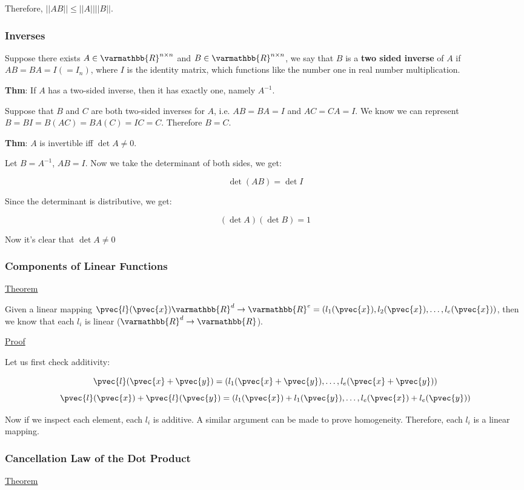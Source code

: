 \documentclass[11 pt, twoside]{article}
\begin{document}
Therefore, $||AB|| \leq ||A|| ||B||$.

\subsubsection{Inverses}

Suppose there exists $A \in \varmathbb{R}^{n \times n}$ and $B \in
\varmathbb{R}^{n \times n}$, we say that $B$ is a \textbf{two sided inverse} of
$A$ if $AB = BA = I (= I_n)$, where $I$ is the identity matrix, which functions
like the number one in real number multiplication.

\textbf{Thm}: If $A$ has a two-sided inverse, then it has exactly one, namely
$A^{-1}$.

Suppose that $B$ and $C$ are both two-sided inverses for $A$, i.e. $AB = BA = I$
and $AC = CA = I$. We know we can represent $B = BI = B(AC) = BA(C) = IC = C$.
Therefore $B = C$.

\textbf{Thm}: $A$ is invertible iff $\det A \neq 0$.

Let $B = A^{-1}$, $AB = I$. Now we take the determinant of both sides, we get:

$$\det (AB) = \det I$$

Since the determinant is distributive, we get:

$$(\det A)(\det B) = 1$$

Now it's clear that $\det A \neq 0$

\subsubsection{Components of Linear Functions}
\underline{Theorem}

Given a linear mapping $\pvec{l}(\pvec{x}) \varmathbb{R}^d \to \varmathbb{R}^e = (l_1(\pvec{x}), l_2(\pvec{x}),
\dots, l_e(\pvec{x}))$, then we know that each $l_i$ is linear ($\varmathbb{R}^d
\to \varmathbb{R}$).

\underline{Proof}

Let us first check additivity:

\[
\pvec{l}(\pvec{x} + \pvec{y}) = (l_1(\pvec{x} + \pvec{y}), \dots, l_e(\pvec{x} +
\pvec{y}))
\]
\[
\pvec{l}(\pvec{x}) + \pvec{l}(\pvec{y}) = (l_1(\pvec{x}) + l_1(\pvec{y}), \dots,
l_e(\pvec{x}) + l_e(\pvec{y}))
\]

Now if we inspect each element, each $l_i$ is additive. A similar argument can
be made to prove homogeneity. Therefore, each $l_i$ is a linear mapping.

\subsubsection{Cancellation Law of the Dot Product}
\underline{Theorem}
\end{document}
